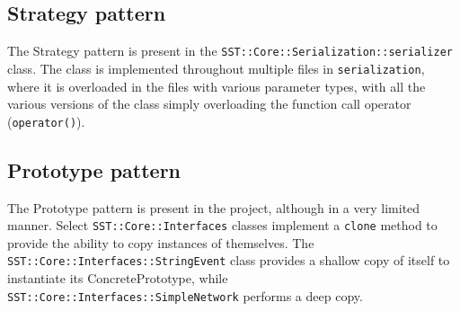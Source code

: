 \subsection{Strategy pattern}
The Strategy pattern is present in the \texttt{SST::Core::Serialization::serializer} class. The class is implemented throughout multiple files in \texttt{serialization}, where it is overloaded in the files with various parameter types, with all the various versions of the class simply overloading the function call operator (\texttt{operator()}).

\subsection{Prototype pattern}
The Prototype pattern is present in the project, although in a very limited manner. Select \texttt{SST::Core::Interfaces} classes implement a \texttt{clone} method to provide the ability to copy instances of themselves. The \\ \texttt{SST::Core::Interfaces::StringEvent} class provides a shallow copy of itself to instantiate its ConcretePrototype, while \texttt{SST::Core::Interfaces::SimpleNetwork} performs a deep copy.
